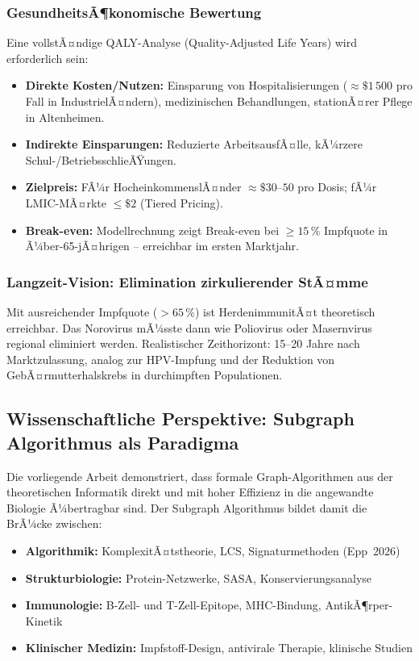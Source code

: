 ﻿\documentclass[a4paper,12pt]{article}
\theoremstyle{plain}
\theoremstyle{definition}
\theoremstyle{remark}
\begin{document}
\subsubsection{GesundheitsÃ¶konomische Bewertung}

Eine vollstÃ¤ndige QALY-Analyse (Quality-Adjusted Life Years) wird erforderlich sein:

\begin{itemize}
  \item \textbf{Direkte Kosten/Nutzen:} Einsparung von Hospitalisierungen ($\approx\!
        \$1\,500$ pro Fall in IndustrielÃ¤ndern), medizinischen Behandlungen,
        stationÃ¤rer Pflege in Altenheimen.
  \item \textbf{Indirekte Einsparungen:} Reduzierte ArbeitsausfÃ¤lle, kÃ¼rzere
        Schul-/BetriebsschlieÃŸungen.
  \item \textbf{Zielpreis:} FÃ¼r HocheinkommenslÃ¤nder $\approx\$30$--$50$ pro Dosis;
        fÃ¼r LMIC-MÃ¤rkte $\leq\$2$ (Tiered Pricing).
  \item \textbf{Break-even:} Modellrechnung zeigt Break-even bei $\geq15\,\%$
        Impfquote in Ã¼ber-65-jÃ¤hrigen -- erreichbar im ersten Marktjahr.
\end{itemize}

\subsubsection{Langzeit-Vision: Elimination zirkulierender StÃ¤mme}

Mit ausreichender Impfquote ($>65\,\%$) ist HerdenimmunitÃ¤t theoretisch erreichbar.
Das Norovirus mÃ¼sste dann wie Poliovirus oder Masernvirus regional eliminiert werden.
Realistischer Zeithorizont: 15--20 Jahre nach Marktzulassung, analog zur HPV-Impfung
und der Reduktion von GebÃ¤rmutterhalskrebs in durchimpften Populationen.

\subsection{Wissenschaftliche Perspektive: Subgraph Algorithmus als Paradigma}

Die vorliegende Arbeit demonstriert, dass formale Graph-Algorithmen aus der
theoretischen Informatik direkt und mit hoher Effizienz in die angewandte Biologie
Ã¼bertragbar sind. Der Subgraph Algorithmus bildet damit die BrÃ¼cke zwischen:

\begin{itemize}
  \item \textbf{Algorithmik:} KomplexitÃ¤tstheorie, LCS, Signaturmethoden (Epp~2026)
  \item \textbf{Strukturbiologie:} Protein-Netzwerke, SASA, Konservierungsanalyse
  \item \textbf{Immunologie:} B-Zell- und T-Zell-Epitope, MHC-Bindung, AntikÃ¶rper-Kinetik
  \item \textbf{Klinischer Medizin:} Impfstoff-Design, antivirale Therapie, klinische Studien
\end{itemize}
\end{document}
